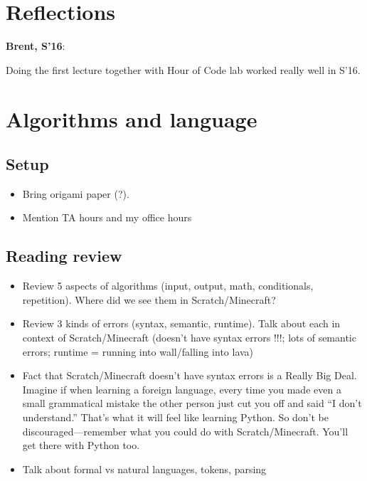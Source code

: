 \documentclass{article}
\newenvironment{reflect}[1]
{
  \begin{lrbox}{\reflectbox}
    \begin{minipage}[t]{\textwidth}
      \textbf{#1}:
}{
    \end{minipage}
  \end{lrbox}
  \fbox{\usebox{\reflectbox}}
}
\begin{document}
\section*{Reflections}

\begin{reflect}{Brent, S'16}
  Doing the first lecture together with Hour of Code lab worked really
  well in S'16.
\end{reflect}

\newpage

\section{Algorithms and language}

\subsection*{Setup}

\begin{itemize}
\item Bring origami paper (?).
\item Mention TA hours and my office hours
\end{itemize}

\subsection*{Reading review}

\begin{itemize}
\item Review 5 aspects of algorithms (input, output, math,
  conditionals, repetition).  Where did we see them in
  Scratch/Minecraft?
\item Review 3 kinds of errors (syntax, semantic, runtime).  Talk
  about each in context of Scratch/Minecraft (doesn't have syntax
  errors !!!; lots of semantic errors; runtime = running into
  wall/falling into lava)
\item Fact that Scratch/Minecraft doesn't have syntax errors is a
  Really Big Deal.  Imagine if when learning a foreign language, every
  time you made even a small grammatical mistake the other person just
  cut you off and said ``I don't understand.''  That's what it will
  feel like learning Python.  So don't be discouraged---remember what
  you could do with Scratch/Minecraft.  You'll get there with Python
  too.
\item Talk about formal vs natural languages, tokens, parsing
\end{itemize}
\end{document}
